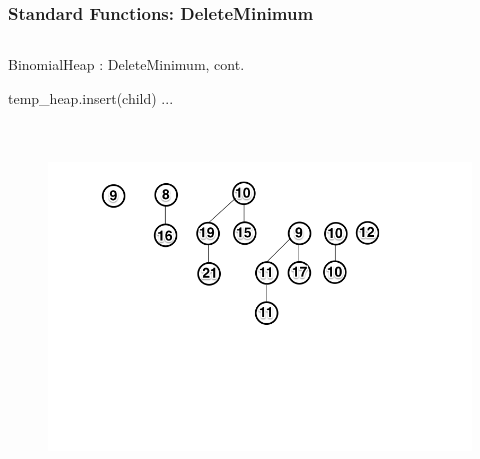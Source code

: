 \documentclass[13pt]{beamer}
\begin{document}
\begin{frame}
\frametitle{Standard Functions: DeleteMinimum}

  \begin{columns}[T] %
    \begin{column}[T]{8cm} %
        \begin{algorithm}[H]
        \small
        \caption{BinomialHeap : DeleteMinimum, cont.}
        \begin{algorithmic}
              \STATE temp\_heap.insert(child)
          \ENDFOR ...
        \end{algorithmic}
        \end{algorithm}
    \end{column}     
  \end{columns}

  \begin{figure}
    \includegraphics[height=9cm]{./img/deleteminB.png}
  \end{figure}
\end{frame}
\end{document}
